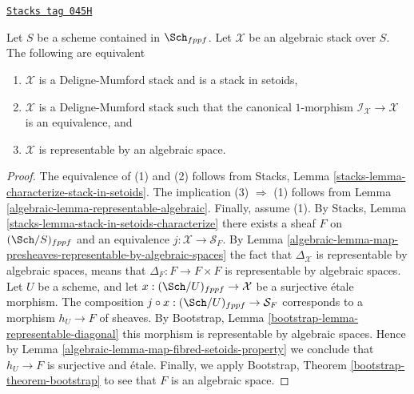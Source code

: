 \begin{lemma}
\label{algebraic-lemma-algebraic-stack-no-automorphisms}
\href{https://stacks.math.columbia.edu/tag/045H}{\texttt{Stacks tag 045H}}

Let $S$ be a scheme contained in $\Sch_{fppf}$.
Let $\mathcal{X}$ be an algebraic stack over $S$.
The following are equivalent
\begin{enumerate}
\item $\mathcal{X}$ is a Deligne-Mumford stack and is a stack in setoids,
\item $\mathcal{X}$ is a Deligne-Mumford stack such that the
canonical $1$-morphism $\mathcal{I}_\mathcal{X} \to \mathcal{X}$
is an equivalence, and
\item $\mathcal{X}$ is representable by an algebraic space.
\end{enumerate}
\end{lemma}

\begin{proof}

The equivalence of (1) and (2) follows from
Stacks, Lemma \ref{stacks-lemma-characterize-stack-in-setoids}.
The implication (3) $\Rightarrow$ (1) follows from
Lemma \ref{algebraic-lemma-representable-algebraic}.
Finally, assume (1). By
Stacks, Lemma \ref{stacks-lemma-stack-in-setoids-characterize}
there exists a sheaf $F$ on $(\Sch/S)_{fppf}$
and an equivalence $j : \mathcal{X} \to \mathcal{S}_F$. By
Lemma \ref{algebraic-lemma-map-presheaves-representable-by-algebraic-spaces}
the fact that $\Delta_\mathcal{X}$ is representable by algebraic
spaces, means that $\Delta_F : F \to F \times F$
is representable by algebraic spaces.
Let $U$ be a scheme, and let $x : (\Sch/U)_{fppf} \to \mathcal{X}$
be a surjective \'etale morphism. The composition
$j \circ x : (\Sch/U)_{fppf} \to \mathcal{S}_F$
corresponds to a morphism $h_U \to F$ of sheaves. By
Bootstrap, Lemma \ref{bootstrap-lemma-representable-diagonal}
this morphism is representable by algebraic spaces.
Hence by
Lemma \ref{algebraic-lemma-map-fibred-setoids-property}
we conclude that $h_U \to F$ is surjective and \'etale.
Finally, we apply
Bootstrap, Theorem \ref{bootstrap-theorem-bootstrap}
to see that $F$ is an algebraic space.
\end{proof}

